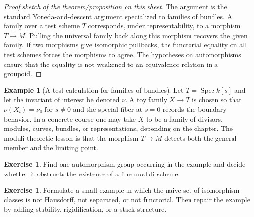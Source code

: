 \documentclass[11pt]{amsart}
\theoremstyle{definition}
\newtheorem{example}[theorem]{Example}
\newtheorem{exercise}[theorem]{Exercise}
\newcommand{\Spec}{\operatorname{Spec}}
\begin{document}
\begin{proof}[Proof sketch of the theorem/proposition on this sheet]
The argument is the standard Yoneda-and-descent argument specialized to families of bundles.  A family over a test scheme $T$ corresponds, under representability, to a morphism $T\to M$.  Pulling the universal family back along this morphism recovers the given family.  If two morphisms give isomorphic pullbacks, the functorial equality on all test schemes forces the morphisms to agree.  The hypotheses on automorphisms ensure that the equality is not weakened to an equivalence relation in a groupoid.
\end{proof}
\begin{example}[A test calculation for families of bundles]
Let $T=\Spec k[s]$ and let the invariant of interest be denoted $\nu$.  A toy family $X\to T$ is chosen so that $\nu(X_t)=\nu_0$ for $s\ne0$ and the special fiber at $s=0$ records the boundary behavior.  In a concrete course one may take $X$ to be a family of divisors, modules, curves, bundles, or representations, depending on the chapter.  The moduli-theoretic lesson is that the morphism $T\to M$ detects both the general member and the limiting point.
\end{example}
\begin{exercise}
Find one automorphism group occurring in the example and decide whether it obstructs the existence of a fine moduli scheme.
\end{exercise}
\begin{exercise}
Formulate a small example in which the naive set of isomorphism classes is not Hausdorff, not separated, or not functorial.  Then repair the example by adding stability, rigidification, or a stack structure.
\end{exercise}
\clearpage
\end{document}
